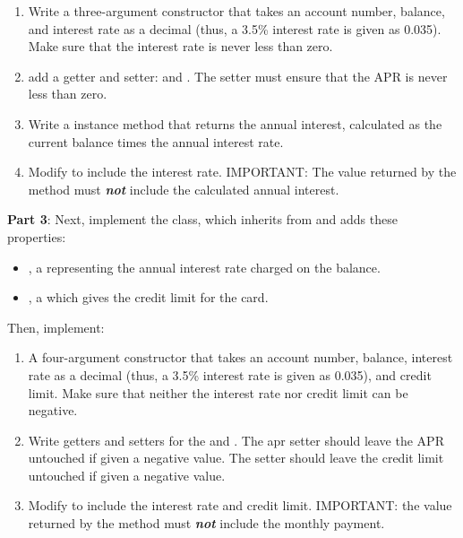 \begin{exercise}
\begin{enumerate}
\item Write a three-argument constructor that takes an account number, balance, and interest rate as a decimal (thus, a 3.5\% interest rate is given as 0.035). Make sure that the interest rate is never less than zero.

\item add a getter and setter:  and . The setter must ensure that the APR is never less than zero.

\item Write a  instance method that returns the annual interest, calculated as the current balance times the annual interest rate.

\item Modify  to include the interest rate. IMPORTANT: The value returned by the  method must {\bf {\em not}} include the calculated annual interest.
\end{enumerate}

{\bf Part 3}: Next, implement the  class, which inherits from  and adds these  properties:

\begin{itemize}
\item {}, a  representing the annual interest rate charged on the balance.
\item {}, a  which gives the credit limit for the card.
\end{itemize}

Then, implement:
\begin{enumerate}
\item A four-argument constructor that takes an account number, balance, interest rate as a decimal (thus, a 3.5\% interest rate is given as 0.035), and credit limit. Make sure that neither the interest rate nor credit limit can be negative.

\item Write getters and setters for the  and . The apr setter should leave the APR untouched if given a negative value. The  setter should leave the credit limit untouched if given a negative value.

\item Modify  to include the interest rate and credit limit. IMPORTANT: the value returned by the  method must {\bf {\em not}} include the monthly payment.


\end{enumerate}
\end{exercise}
